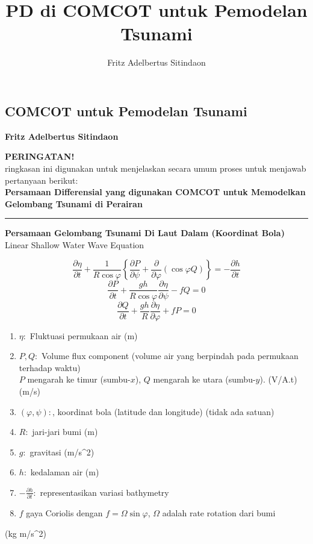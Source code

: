 \documentclass{article}
\title{PD di COMCOT untuk Pemodelan Tsunami}
\author{Fritz Adelbertus Sitindaon}
\date{}
\begin{document}
\begin{flushright}
    \section*{COMCOT untuk Pemodelan Tsunami}
    \textbf{Fritz Adelbertus Sitindaon}
\end{flushright}
\textbf{PERINGATAN!}\\
ringkasan ini digunakan untuk menjelaskan secara umum proses untuk menjawab pertanyaan berikut:\\
\textbf{Persamaan Differensial yang digunakan COMCOT untuk Memodelkan Gelombang Tsunami di Perairan}

\vspace{0.5cm}\hrule height 2pt\vspace{0.5cm}

\begin{center}
    \textbf{Persamaan Gelombang Tsunami Di Laut Dalam (Koordinat Bola)}
    \\Linear Shallow Water Wave Equation
\end{center}
\begin{equation}
    \frac{\partial \eta}{\partial t} + \frac{1}{R\cos \varphi}\left\{\frac{\partial P}{\partial \psi}+\frac{\partial}{\partial \varphi}(\cos \varphi Q)\right\} = -\frac{\partial h}{\partial t}
\end{equation}
\begin{equation}
    \frac{\partial P}{\partial t} + \frac{gh}{R\cos \varphi}\frac{\partial \eta}{\partial \psi}-fQ=0
\end{equation}
\begin{equation}
    \frac{\partial Q}{\partial t} + \frac{gh}{R}\frac{\partial \eta}{\partial\varphi}+fP=0
\end{equation}

\begin{enumerate}
    \item $\eta:$ Fluktuasi permukaan air (m)
    \item $P,Q:$ Volume flux component (volume air yang berpindah pada permukaan terhadap waktu)\\
    $P$ mengarah ke timur (sumbu-$x$), $Q$ mengarah ke utara (sumbu-$y$). (V/A.t) (m/s)
    \item $(\varphi, \psi):$, koordinat bola (latitude dan longitude) (tidak ada satuan) 
    \item $R:$ jari-jari bumi (m)
    \item $g:$ gravitasi (m/s^2)
    \item $h:$ kedalaman air (m)
    \item $-\frac{\partial h}{\partial t}:$ representasikan variasi bathymetry
    \item $f$ gaya Coriolis dengan $f=\Omega \sin\varphi$, $\Omega$ adalah rate rotation dari bumi
\end{enumerate} (kg m/s^2)
\end{document}
